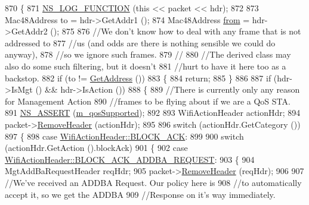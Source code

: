 \begin{DoxyCode}
870 \{
871   \hyperlink{log-macros-disabled_8h_a90b90d5bad1f39cb1b64923ea94c0761}{NS\_LOG\_FUNCTION} (\textcolor{keyword}{this} << packet << hdr);
872 
873   Mac48Address to = hdr->GetAddr1 ();
874   Mac48Address \hyperlink{lte__amc_8m_a1b4c81ff74eb1a626b5ade44c81004b3}{from} = hdr->GetAddr2 ();
875 
876   \textcolor{comment}{//We don't know how to deal with any frame that is not addressed to}
877   \textcolor{comment}{//us (and odds are there is nothing sensible we could do anyway),}
878   \textcolor{comment}{//so we ignore such frames.}
879   \textcolor{comment}{//}
880   \textcolor{comment}{//The derived class may also do some such filtering, but it doesn't}
881   \textcolor{comment}{//hurt to have it here too as a backstop.}
882   \textcolor{keywordflow}{if} (to != \hyperlink{classns3_1_1RegularWifiMac_aea719a7d05fbc664c50479fc900777b7}{GetAddress} ())
883     \{
884       \textcolor{keywordflow}{return};
885     \}
886 
887   \textcolor{keywordflow}{if} (hdr->IsMgt () && hdr->IsAction ())
888     \{
889       \textcolor{comment}{//There is currently only any reason for Management Action}
890       \textcolor{comment}{//frames to be flying about if we are a QoS STA.}
891       \hyperlink{assert_8h_a6dccdb0de9b252f60088ce281c49d052}{NS\_ASSERT} (\hyperlink{classns3_1_1RegularWifiMac_aeecdb918687493a8efdd70304bc0cee9}{m\_qosSupported});
892 
893       WifiActionHeader actionHdr;
894       packet->\hyperlink{classns3_1_1Packet_a0961eccf975d75f902d40956c93ba63e}{RemoveHeader} (actionHdr);
895 
896       \textcolor{keywordflow}{switch} (actionHdr.GetCategory ())
897         \{
898         \textcolor{keywordflow}{case} \hyperlink{classns3_1_1WifiActionHeader_a5402becd11b4077f22d76c4d0d923358ae1954449580715d3d737a12739923ef2}{WifiActionHeader::BLOCK\_ACK}:
899 
900           \textcolor{keywordflow}{switch} (actionHdr.GetAction ().blockAck)
901             \{
902             \textcolor{keywordflow}{case} \hyperlink{classns3_1_1WifiActionHeader_a575d216d28074b8e5fc25d17692f6962aae76baa0c4e02e79e3d69f7d926cc27d}{WifiActionHeader::BLOCK\_ACK\_ADDBA\_REQUEST}:
903               \{
904                 MgtAddBaRequestHeader reqHdr;
905                 packet->\hyperlink{classns3_1_1Packet_a0961eccf975d75f902d40956c93ba63e}{RemoveHeader} (reqHdr);
906 
907                 \textcolor{comment}{//We've received an ADDBA Request. Our policy here is}
908                 \textcolor{comment}{//to automatically accept it, so we get the ADDBA}
909                 \textcolor{comment}{//Response on it's way immediately.}

\end{DoxyCode}
